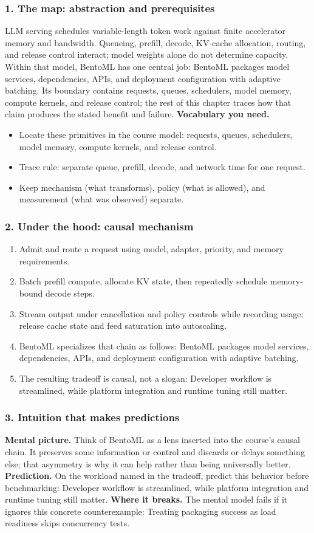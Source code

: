 \subsubsection*{1. The map: abstraction and prerequisites}
LLM serving schedules variable-length token work against finite accelerator memory and bandwidth. Queueing, prefill, decode, KV-cache allocation, routing, and release control interact; model weights alone do not determine capacity.
Within that model, BentoML has one central job: BentoML packages model services, dependencies, APIs, and deployment configuration with adaptive batching. Its boundary contains requests, queues, schedulers, model memory, compute kernels, and release control; the rest of this chapter traces how that claim produces the stated benefit and failure.
\textbf{Vocabulary you need.}\begin{itemize}
\item Locate these primitives in the course model: requests, queues, schedulers, model memory, compute kernels, and release control.
\item Trace rule: separate queue, prefill, decode, and network time for one request.
\item Keep mechanism (what transforms), policy (what is allowed), and measurement (what was observed) separate.
\end{itemize}
\subsubsection*{2. Under the hood: causal mechanism}\begin{enumerate}
\item Admit and route a request using model, adapter, priority, and memory requirements.
\item Batch prefill compute, allocate KV state, then repeatedly schedule memory-bound decode steps.
\item Stream output under cancellation and policy controls while recording usage; release cache state and feed saturation into autoscaling.
\item BentoML specializes that chain as follows: BentoML packages model services, dependencies, APIs, and deployment configuration with adaptive batching.
\item The resulting tradeoff is causal, not a slogan: Developer workflow is streamlined, while platform integration and runtime tuning still matter.
\end{enumerate}
\subsubsection*{3. Intuition that makes predictions}
\textbf{Mental picture.} Think of BentoML as a lens inserted into the course's causal chain. It preserves some information or control and discards or delays something else; that asymmetry is why it can help rather than being universally better.
\textbf{Prediction.} On the workload named in the tradeoff, predict this behavior before benchmarking: Developer workflow is streamlined, while platform integration and runtime tuning still matter.
\textbf{Where it breaks.} The mental model fails if it ignores this concrete counterexample: Treating packaging success as load readiness skips concurrency tests.
